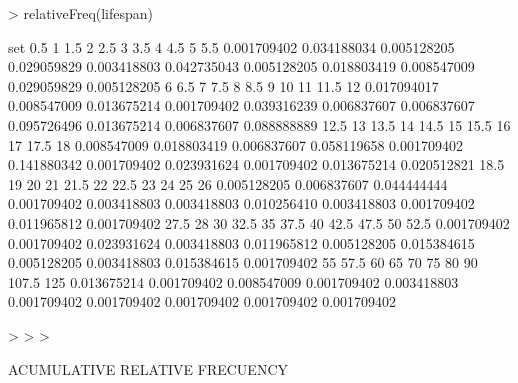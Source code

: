 \documentclass[a4paper]{article}
\begin{document}
\begin{Schunk}
\begin{Sinput}
> relativeFreq(lifespan)
\end{Sinput}
\begin{Soutput}
set
        0.5           1         1.5           2         2.5           3         3.5           4         4.5           5         5.5 
0.001709402 0.034188034 0.005128205 0.029059829 0.003418803 0.042735043 0.005128205 0.018803419 0.008547009 0.029059829 0.005128205 
          6         6.5           7         7.5           8         8.5           9          10          11        11.5          12 
0.017094017 0.008547009 0.013675214 0.001709402 0.039316239 0.006837607 0.006837607 0.095726496 0.013675214 0.006837607 0.088888889 
       12.5          13        13.5          14        14.5          15        15.5          16          17        17.5          18 
0.008547009 0.018803419 0.006837607 0.058119658 0.001709402 0.141880342 0.001709402 0.023931624 0.001709402 0.013675214 0.020512821 
       18.5          19          20          21        21.5          22        22.5          23          24          25          26 
0.005128205 0.006837607 0.044444444 0.001709402 0.003418803 0.003418803 0.010256410 0.003418803 0.001709402 0.011965812 0.001709402 
       27.5          28          30        32.5          35        37.5          40        42.5        47.5          50        52.5 
0.001709402 0.001709402 0.023931624 0.003418803 0.011965812 0.005128205 0.015384615 0.005128205 0.003418803 0.015384615 0.001709402 
         55        57.5          60          65          70          75          80          90       107.5         125 
0.013675214 0.001709402 0.008547009 0.001709402 0.003418803 0.001709402 0.001709402 0.001709402 0.001709402 0.001709402 
\end{Soutput}
\begin{Sinput}
> 
> 
> 
\end{Sinput}
\end{Schunk}



ACUMULATIVE RELATIVE FRECUENCY
\end{document}
